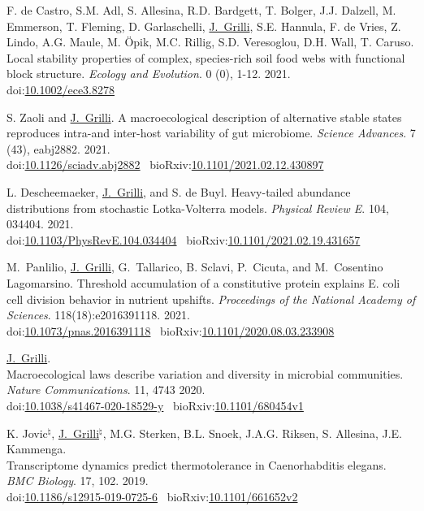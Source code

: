 \documentclass[10pt]{article}
\newcommand\JG{\underline{J.~Grilli}}
\newcommand\doilink[1]{\href{http://dx.doi.org/#1}{#1}}
\newcommand\doi[1]{doi:\doilink{#1}}
\newcommand\bioarxivlink[1]{\href{http://biorxiv.org/content/early/#1}{#1}}
\newcommand\bioarxiv[1]{bioRxiv:\bioarxivlink{#1}}
\begin{document}
\begin{bibenum}
    \item F. de Castro, S.M. Adl, S. Allesina, R.D. Bardgett, T. Bolger, J.J. Dalzell, M. Emmerson, T. Fleming, D. Garlaschelli, \JG, S.E. Hannula, F. de Vries, Z. Lindo, A.G. Maule, M. Öpik, M.C. Rillig, S.D. Veresoglou, D.H. Wall, T. Caruso.
    Local stability properties of complex, species-rich soil food webs with functional block structure.
    \emph{Ecology and Evolution}. 0 (0), 1-12. 2021.
    \\
    \doi{10.1002/ece3.8278} 


    \item S. Zaoli and \JG.
    A macroecological description of alternative stable states reproduces intra-and inter-host variability of gut microbiome.
    \emph{Science Advances}. 7 (43), eabj2882. 2021.
    \\
    \doi{10.1126/sciadv.abj2882} \
    \bioarxiv{10.1101/2021.02.12.430897}

    \item L. Descheemaeker,  \JG, and S. de Buyl.
    Heavy-tailed abundance distributions from stochastic Lotka-Volterra models.
    \emph{Physical Review E}. 104, 034404. 2021.
    \\
    \doi{10.1103/PhysRevE.104.034404} \
    \bioarxiv{10.1101/2021.02.19.431657}

    \item M.~Panlilio, \JG, G.~Tallarico, B. Sclavi, P.~Cicuta, and M.~Cosentino Lagomarsino.
	Threshold accumulation of a constitutive protein explains E. coli cell division behavior in nutrient upshifts. 
    \emph{Proceedings of the National Academy of Sciences}. 118(18):e2016391118. 2021. \\
    \doi{10.1073/pnas.2016391118} \
	\bioarxiv{10.1101/2020.08.03.233908}

    \item \JG. \\
	Macroecological laws describe variation and diversity in microbial communities. 
    \emph{Nature Communications}. 11, 4743 2020.
    \\
    \doi{10.1038/s41467-020-18529-y} \
	\bioarxiv{10.1101/680454v1}

    \item K. Jovic$^\natural$, \JG$^\natural$,  M.G. Sterken, B.L. Snoek, J.A.G. Riksen, S. Allesina, J.E. Kammenga. \\
	Transcriptome dynamics predict thermotolerance in Caenorhabditis elegans. 
    \emph{BMC Biology}. 17, 102. 2019.
    \\
    \doi{10.1186/s12915-019-0725-6} \
	\bioarxiv{10.1101/661652v2}


\end{bibenum}
\end{document}
